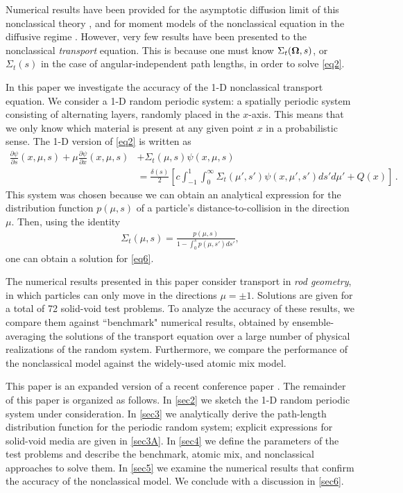 \documentclass[12pt]{article}
\newcommand{\uomega}{{\bf \Omega}}
\begin{document}
Numerical results have been provided for the asymptotic diffusion limit of this nonclassical theory \cite{larvas11,vaslar09,vas13,vaslar14b}, and for moment models of the nonclassical equation in the diffusive regime \cite{kry13}.
However, very few results have been presented to the nonclassical \textit{transport} equation.
This is because one must know $\Sigma_t(\uomega,s)$, or $\Sigma_t(s)$ in the case of angular-independent path lengths, in order to solve \cref{eq2}. 

In this paper we investigate the accuracy of the 1-D nonclassical transport equation.
We consider a 1-D random periodic system: a spatially periodic system consisting of alternating layers, randomly placed in the $x$-axis.
This means that we only know which material is present at any given point $x$ in a probabilistic sense.
The 1-D version of \cref{eq2} is written as
\begin{align}\label{eq6}
\frac{\partial\psi}{\partial s}(x,\mu,s) + \mu\frac{\partial \psi}{\partial x}(x,\mu,s) &+ \Sigma_t(\mu,s)\psi(x,\mu,s) 
\\& = \frac{\delta(s)}{2}\left[ c\int_{-1}^1\int_0^\infty \Sigma_t(\mu',s')\psi(x,\mu',s')ds' d\mu' + Q(x) \right]\,. \nonumber
\end{align}
This system was chosen because we can obtain an analytical expression for the distribution function $p(\mu,s)$ of a particle's distance-to-collision in the direction $\mu$.
Then, using the identity \cite{vaslar14a}
\begin{align}\label{eq7}
\Sigma_t(\mu,s)=\frac{p(\mu,s)}{1-\int_0^sp(\mu,s')ds'},
\end{align}
one can obtain a solution for \cref{eq6}.

The numerical results presented in this paper consider transport in {\em rod geometry}, in which particles can only move in the directions $\mu = \pm 1$. Solutions are given for a total of 72 solid-void test problems. To analyze the accuracy of these results, we compare them against ``benchmark" numerical results, obtained by ensemble-averaging the solutions of the transport equation over a large number of physical realizations of the random system. Furthermore, we compare
the performance of the nonclassical model against the widely-used atomic mix model.

This paper is an expanded version of a recent conference paper \cite{mc15}.
The remainder of this paper is organized as follows. In \cref{sec2} we sketch the 1-D random periodic system under consideration. In \cref{sec3} we analytically derive the path-length distribution function for the periodic random system; explicit expressions for solid-void media are given in \cref{sec3A}. In \cref{sec4} we define the parameters of the test problems and describe the benchmark, atomic mix, and nonclassical approaches to solve them. In \cref{sec5} we examine the numerical results that confirm the accuracy of the nonclassical model. We conclude with a discussion in \cref{sec6}.
\end{document}

